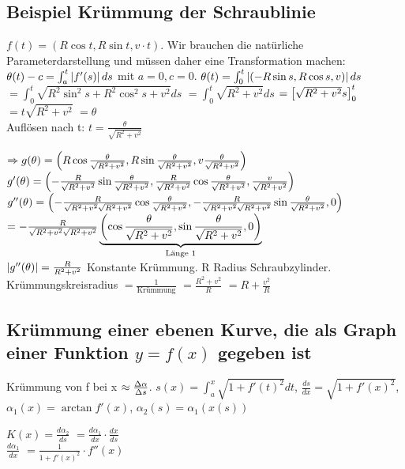 \renewcommand{\ldate}{2015-10-29}

\subsection{Beispiel Krümmung der Schraublinie}
$f(t) = (R \cos t, R \sin t, v\cdot t)$. Wir brauchen die natürliche Parameterdarstellung und müssen daher eine Transformation machen: 
$\theta(t) - c = \int_{a}^{t}  \left\vert f'(s) \right\vert  ds$ mit $ a=0, c=0$.
$\theta(t) = \int_{0}^{t}  \left\vert  \left( -R \sin s, R \cos s, v \right)  \right\vert  ds$
$=\int_{0}^{t} \sqrt{R^2 \sin^2 s + R^2 \cos^2 s + v^2} ds $
$= \int_{0}^{t} \sqrt{R^2 + v^2} ds $ 
$=  \left[ \sqrt{R^2 + v^2} s \right] _0^t$
$= t \sqrt{R^2 + v^2}$
$=\theta$\\
Auflösen nach t: $ t=\frac{\theta}{\sqrt{R^2 + v^2}}$

\renewcommand{\locpl}{\sqrt{R^2 + v^2}}

$\Rightarrow g(\theta) =  \left( R \cos \frac{\theta}{\sqrt{R^2 + v^2}}, R \sin \frac{\theta}{\sqrt{R^2 + v^2}}, v \frac{\theta}{\sqrt{R^2 + v^2}} \right) $\\
$ g'(\theta)=\rbr{-\frac{R}{\locpl} \sin \frac{\theta}{\locpl}, \frac{R}{\locpl} \cos \frac{\theta}{\locpl}, \frac{v}{\locpl} }$\\
$ g''(\theta)=\rbr{-\frac{R}{\locpl \locpl} \cos \frac{\theta}{\locpl}, -\frac{R}{\locpl \locpl} \sin \frac{\theta}{\locpl}, 0}$\\
$ = -\frac{R}{\locpl \locpl} \underbrace{\rbr{\cos \frac{\theta}{\locpl}, \sin \frac{\theta}{\locpl}, 0}}_{\textrm{Länge 1}}$\\
$  \left\vert g''(\theta) \right\vert  = \frac{R}{R^2 + v^2} $ Konstante Krümmung. R Radius Schraubzylinder. 
Krümmungskreisradius $=\frac{1}{\textrm{Krümmung}}$ 
$ = \frac{R^2 + v^2 }{R} $
$ = R + \frac{v^2}{R}$

\subsection{Krümmung einer ebenen Kurve, die als Graph einer Funktion $y=f(x)$ gegeben ist}
Krümmung von f bei x $\approx \frac{\Delta \alpha}{\Delta s}$.
$s(x) = \int_{a}^{x} \sqrt{1 + f'(t)^2} dt$,
$ \frac{ds}{dx} = \sqrt{1+f'(x)^2}$,
$\alpha_1 (x) = \arctan f'(x)$,
$\alpha_2(s) = \alpha_1(x(s))$

$K(x) = \frac{d \alpha_2 }{ds}$ 
$= \frac{d\alpha_1}{dx} \cdot \frac{dx}{ds}$\\
$\frac{d\alpha_1}{dx}$ 
$= \frac{1}{1+f'(x)^2} \cdot f''(x)$

